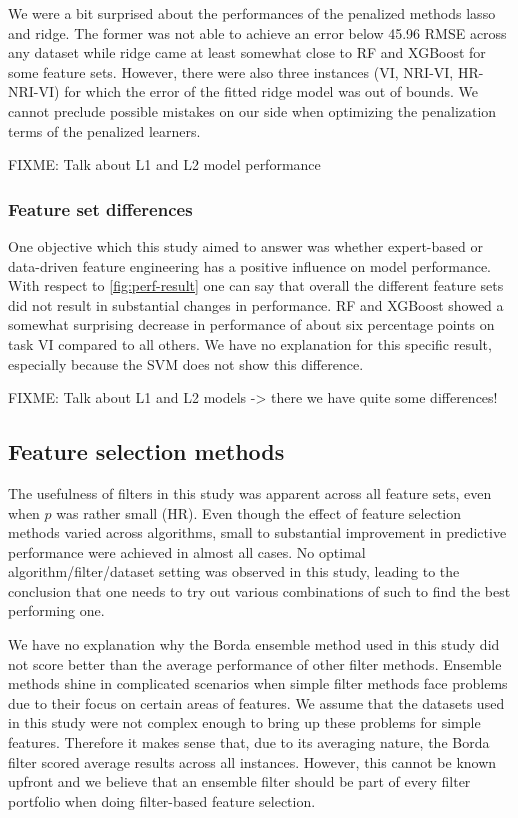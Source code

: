 \documentclass[letterpaper, peerreview]{IEEEtran}
\begin{document}
We were a bit surprised about the performances of the penalized methods lasso and ridge.
The former was not able to achieve an error below 45.96 RMSE across any dataset while ridge came at least somewhat close to RF and XGBoost for some feature sets.
However, there were also three instances (VI, NRI-VI, HR-NRI-VI) for which the error of the fitted ridge model was out of bounds.
We cannot preclude possible mistakes on our side when optimizing the penalization terms of the penalized learners.

FIXME: Talk about L1 and L2 model performance

\subsubsection{Feature set differences}
One objective which this study aimed to answer was whether expert-based or data-driven feature engineering has a positive influence on model performance.
With respect to \autoref{fig:perf-result} one can say that overall the different feature sets did not result in substantial changes in performance.
RF and XGBoost showed a somewhat surprising decrease in performance of about six percentage points on task VI compared to all others.
We have no explanation for this specific result, especially because the SVM does not show this difference.

FIXME: Talk about L1 and L2 models -> there we have quite some differences!

\subsection{Feature selection methods}

The usefulness of filters in this study was apparent across all feature sets, even when $p$ was rather small (HR).
Even though the effect of feature selection methods varied across algorithms, small to substantial improvement in predictive performance were achieved in almost all cases.
No optimal algorithm/filter/dataset setting was observed in this study, leading to the conclusion that one needs to try out various combinations of such to find the best performing one.

We have no explanation why the Borda ensemble method used in this study did not score better than the average performance of other filter methods.
Ensemble methods shine in complicated scenarios when simple filter methods face problems due to their focus on certain areas of features.
We assume that the datasets used in this study were not complex enough to bring up these problems for simple features.
Therefore it makes sense that, due to its averaging nature, the Borda filter scored average results across all instances.
However, this cannot be known upfront and we believe that an ensemble filter should be part of every filter portfolio when doing filter-based feature selection.
\end{document}
